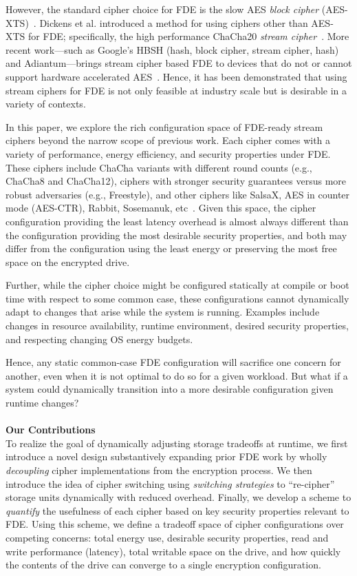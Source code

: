 However, the standard cipher choice for FDE is the slow AES \emph{block cipher}
(AES-XTS)~\cite{XTS, XTSComments, NISTXTS}. Dickens et al. introduced a method
for using ciphers other than AES-XTS for FDE; specifically, the high performance
ChaCha20 \emph{stream cipher}~\cite{StrongBox, ChaCha20}. More recent
work---such as Google's HBSH (hash, block cipher, stream cipher, hash) and
Adiantum---brings stream cipher based FDE to devices that do not or cannot
support hardware accelerated AES~\cite{Adiantum}. Hence, it has been
demonstrated that using stream ciphers for FDE is not only feasible at industry
scale but is desirable in a variety of contexts.

In this paper, we explore the rich configuration space of FDE-ready stream
ciphers beyond the narrow scope of previous work. Each cipher comes with a
variety of performance, energy efficiency, and security properties under FDE.
These ciphers include ChaCha variants with different round counts (e.g., ChaCha8
and ChaCha12), ciphers with stronger security guarantees versus more robust
adversaries (e.g., Freestyle), and other ciphers like SalsaX, AES in counter
mode (AES-CTR), Rabbit, Sosemanuk, etc~\cite{Freestyle, SalsaX, Rabbit,
Sosemanuk, ChaCha20, AESCTR}. Given this space, the cipher configuration
providing the least latency overhead is almost always different than the
configuration providing the most desirable security properties, and both may
differ from the configuration using the least energy or preserving the most free
space on the encrypted drive.

Further, while the cipher choice might be configured statically at compile or
boot time with respect to some common case, these configurations cannot
dynamically adapt to changes that arise while the system is running. Examples
include changes in resource availability, runtime environment, desired security
properties, and respecting changing OS energy budgets.

Hence, any static common-case FDE configuration will sacrifice one concern for
another, even when it is not optimal to do so for a given workload. But what if
a system could dynamically transition into a more desirable configuration given
runtime changes?\\
\\
\textbf{Our Contributions}\\
To realize the goal of dynamically adjusting storage tradeoffs at runtime, we
first introduce a novel design substantively expanding prior FDE work by wholly
\emph{decoupling} cipher implementations from the encryption process. We then
introduce the idea of cipher switching using \emph{switching strategies} to
``re-cipher'' storage units dynamically with reduced overhead. Finally, we
develop a scheme to \emph{quantify} the usefulness of each cipher based on key
security properties relevant to FDE. Using this scheme, we define a tradeoff
space of cipher configurations over competing concerns: total energy use,
desirable security properties, read and write performance (latency), total
writable space on the drive, and how quickly the contents of the drive can
converge to a single encryption configuration.

